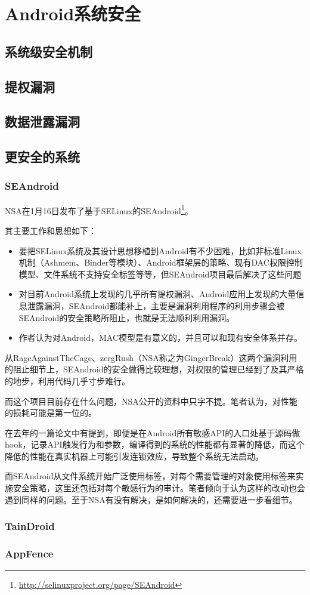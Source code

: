 \chapter{Android系统安全}

\section{系统级安全机制}

\section{提权漏洞}

\section{数据泄露漏洞}

\section{更安全的系统}
\subsection{SEAndroid}
NSA在1月16日发布了基于SELinux的SEAndroid\footnote{\url{http://selinuxproject.org/page/SEAndroid}}。

其主要工作和思想如下：

\begin{itemize}
  \item 要把SELinux系统及其设计思想移植到Android有不少困难，比如非标准Linux机制（Ashmem、Binder等模块）、Android框架层的策略、现有DAC权限控制模型、文件系统不支持安全标签等等，但SEAndroid项目最后解决了这些问题
  \item 对目前Android系统上发现的几乎所有提权漏洞、Android应用上发现的大量信息泄露漏洞，SEAndroid都能补上，主要是漏洞利用程序的利用步骤会被SEAndroid的安全策略所阻止，也就是无法顺利利用漏洞。
  \item 作者认为对Android，MAC模型是有意义的，并且可以和现有安全体系并存。
\end{itemize}

从RageAgainstTheCage、zergRush（NSA称之为GingerBreak）这两个漏洞利用的阻止细节上，SEAndroid的安全做得比较理想，对权限的管理已经到了及其严格的地步，利用代码几乎寸步难行。

而这个项目目前存在什么问题，NSA公开的资料中只字不提。笔者认为，对性能的损耗可能是第一位的。

在去年的一篇论文中有提到，即便是在Android所有敏感API的入口处基于源码做hook，记录API触发行为和参数，编译得到的系统的性能都有显著的降低，而这个降低的性能在真实机器上可能引发连锁效应，导致整个系统无法启动。

而SEAndroid从文件系统开始广泛使用标签，对每个需要管理的对象使用标签来实施安全策略，这里还包括对每个敏感行为的审计。笔者倾向于认为这样的改动也会遇到同样的问题。至于NSA有没有解决，是如何解决的，还需要进一步看细节。

\subsection{TainDroid}

\subsection{AppFence}
